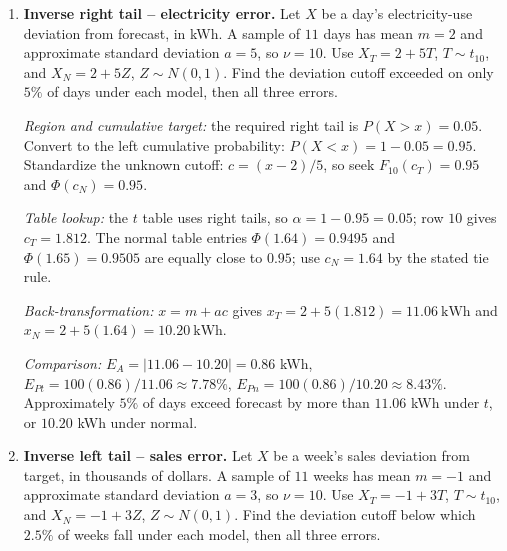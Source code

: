 \begin{enumerate}[leftmargin=*,label=\textbf{\arabic*.},itemsep=5pt]
		\[
		c_L=\frac{-4.86-2}{5}=-1.372,\qquad c_U=\frac{11.06-2}{5}=1.812.
		\]
		\par \textit{Cumulative subtraction:} row $10$ gives $P(T>1.372)=0.10$ and $P(T>1.812)=0.05$. Thus $F_{10}(-1.372)\approx0.10$ by symmetry and $F_{10}(1.812)\approx1-0.05=0.95$. Subtract the cumulative area at the lower bound from that at the upper bound:
		\[
		p_T=F_{10}(1.812)-F_{10}(-1.372)\approx0.9500-0.1000=0.8500.
		\]
		For normal, round to $z_L=-1.37$, $z_U=1.81$. The table gives $\Phi(-1.37)=1-0.9147=0.0853$ and $\Phi(1.81)=0.9649$, so
		\[
		p_N=\Phi(1.81)-\Phi(-1.37)=0.9649-0.0853=0.8796.
		\]
		\par \textit{Comparison:} $E_A=|0.8500-0.8796|=0.0296$, $E_{Pt}=100(0.0296)/0.8500\approx3.48\%$, $E_{Pn}=100(0.0296)/0.8796\approx3.37\%$. About $85\%$ under $t$, compared with $87.96\%$ under normal, arrive within these limits.
		\item \textbf{Inverse right tail -- electricity error.} Let $X$ be a day's electricity-use deviation from forecast, in kWh. A sample of $11$ days has mean $m=2$ and approximate standard deviation $a=5$, so $\nu=10$. Use $X_T=2+5T$, $T\sim t_{10}$, and $X_N=2+5Z$, $Z\sim N(0,1)$. Find the deviation cutoff exceeded on only $5\%$ of days under each model, then all three errors.
		\par \textit{Region and cumulative target:} the required right tail is $P(X>x)=0.05$. Convert to the left cumulative probability: $P(X<x)=1-0.05=0.95$. Standardize the unknown cutoff: $c=(x-2)/5$, so seek $F_{10}(c_T)=0.95$ and $\Phi(c_N)=0.95$.
		\par \textit{Table lookup:} the $t$ table uses right tails, so $\alpha=1-0.95=0.05$; row $10$ gives $c_T=1.812$. The normal table entries $\Phi(1.64)=0.9495$ and $\Phi(1.65)=0.9505$ are equally close to $0.95$; use $c_N=1.64$ by the stated tie rule.
		\par \textit{Back-transformation:} $x=m+ac$ gives $x_T=2+5(1.812)=\boxed{11.06\ \text{kWh}}$ and $x_N=2+5(1.64)=\boxed{10.20\ \text{kWh}}$.
		\par \textit{Comparison:} $E_A=|11.06-10.20|=0.86$ kWh, $E_{Pt}=100(0.86)/11.06\approx7.78\%$, $E_{Pn}=100(0.86)/10.20\approx8.43\%$. Approximately $5\%$ of days exceed forecast by more than $11.06$ kWh under $t$, or $10.20$ kWh under normal.
		\item \textbf{Inverse left tail -- sales error.} Let $X$ be a week's sales deviation from target, in thousands of dollars. A sample of $11$ weeks has mean $m=-1$ and approximate standard deviation $a=3$, so $\nu=10$. Use $X_T=-1+3T$, $T\sim t_{10}$, and $X_N=-1+3Z$, $Z\sim N(0,1)$. Find the deviation cutoff below which $2.5\%$ of weeks fall under each model, then all three errors.

\end{enumerate}
